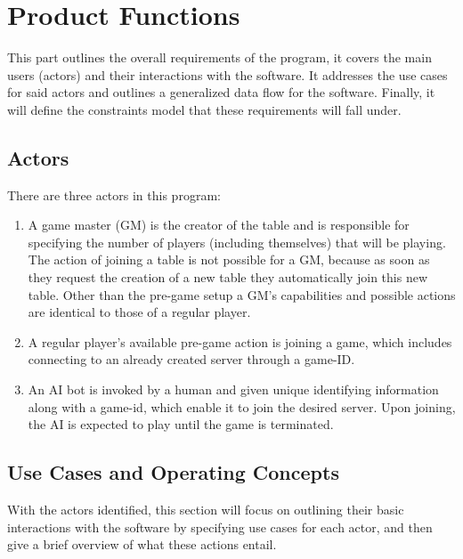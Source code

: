 \documentclass[12pt]{article}
\begin{document}
\section{Product Functions}

This part outlines the overall requirements of the program, it covers the
main users (actors) and their interactions with the software.  It addresses
the use cases for said actors and outlines a generalized data flow for the
software.  Finally, it will define the constraints model that these requirements
will fall under.

\subsection{Actors}


There are three actors in this program:

\begin{enumerate}
\item
A game master (GM) is the creator of the table and is responsible for specifying 
the number of players (including themselves) that will be playing. The action of 
joining a table is not possible for a GM, because as soon as they request the 
creation of a new table they automatically join this new table. Other than the
pre-game setup a GM's capabilities and possible actions are identical to those
of a regular player.

\item
A regular player's available pre-game action is joining a game, which includes
connecting to an already created server through a game-ID. 

\item
An AI bot is invoked by a human and given unique identifying information along
with a game-id, which enable it to join the desired server. Upon joining, the
AI is expected to play until the game is terminated. 
\end{enumerate}


\subsection{Use Cases and Operating Concepts}

With the actors identified, this section will focus on outlining their
basic interactions with the software by specifying use cases for each
actor, and then give a brief overview of what these actions entail.
\end{document}
